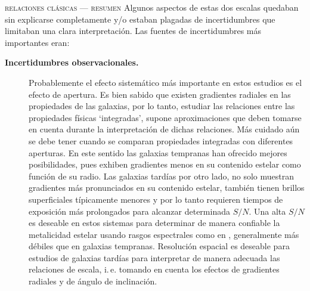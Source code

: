 \documentclass[xcolor=dvipsnames,4pt,hyperref={colorlinks,citecolor=black,linkcolor=black,urlcolor=black}]{beamer}
\begin{document}
\begin{frame}{\textsc{relaciones clásicas --- resumen}}
Algunos aspectos de estas dos escalas quedaban sin explicarse completamente y/o estaban plagadas de
incertidumbres que limitaban una clara interpretación. Las fuentes de incertidumbres más importantes
eran:

\begin{description}
%
\item[\textbf{Incertidumbres observacionales.}] Probablemente el efecto sistemático más importante
en estos estudios es el efecto de apertura. Es bien sabido que existen gradientes radiales en las
propiedades de las galaxias, por lo tanto, estudiar las relaciones entre las propiedades físicas
`integradas', supone aproximaciones que deben tomarse en cuenta durante la interpretación de dichas
relaciones.
Más cuidado aún se debe tener cuando se comparan propiedades integradas con diferentes aperturas. En
este sentido las galaxias tempranas han ofrecido mejores posibilidades, pues exhiben gradientes
menos en su contenido estelar como función de su radio. Las galaxias tardías por otro lado, no solo
muestran gradientes más pronunciados en su contenido estelar, también tienen brillos superficiales
típicamente menores y por lo tanto requieren tiempos de exposición más prolongados para alcanzar
determinada $S/N$. Una alta $S/N$ es deseable en estos sistemas para determinar de manera confiable
la metalicidad estelar usando rasgos espectrales como en \citet{Gallazzi2005}, generalmente más
débiles que en galaxias tempranas. Resolución espacial es deseable para estudios de galaxias tardías
para interpretar de manera adecuada las relaciones de escala, i.\,e. tomando en cuenta los efectos
de gradientes radiales y de ángulo de inclinación.


\end{description}
\end{frame}
\end{document}
